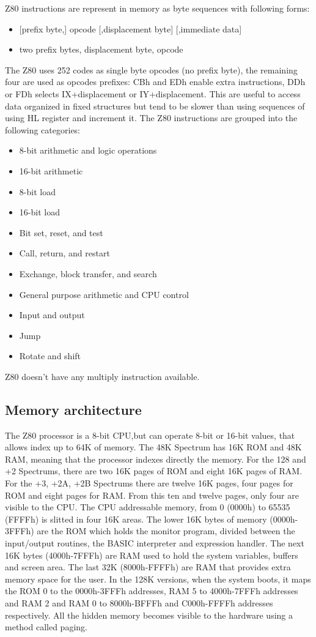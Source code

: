 Z80 instructions are represent in memory as byte sequences with following forms:
\begin{itemize}
\item {[prefix byte,]  opcode  [,displacement byte]  [,immediate data]}
\item {two prefix bytes,  displacement byte,  opcode}
\end{itemize}
The Z80 uses 252 codes as single byte opcodes (no prefix byte), the remaining four are used as opcodes prefixes: CBh and EDh enable extra instructions, DDh or FDh selects IX+displacement or IY+displacement. This are useful to access data organized in fixed structures but tend to be slower than using sequences of using HL register and increment it.
The Z80 instructions are grouped into the following categories:
\begin{itemize}
\item {8-bit arithmetic and logic operations}
\item {16-bit arithmetic}
\item {8-bit load}
\item {16-bit load}
\item {Bit set, reset, and test}
\item {Call, return, and restart}
\item {Exchange, block transfer, and search}
\item {General purpose arithmetic and CPU control}
\item {Input and output}
\item {Jump}
\item {Rotate and shift}
\end{itemize}
Z80 doesn’t have any multiply instruction available.

\subsection{Memory architecture}
The Z80 processor is a 8-bit CPU,but can operate 8-bit or 16-bit values, that allows index up to 64K of memory. The 48K Spectrum has 16K ROM and 48K RAM, meaning that the processor indexes directly  the memory. For the 128 and +2 Spectrums, there are two 16K pages of ROM and eight 16K pages of RAM. For the +3, +2A, +2B Spectrums there are twelve 16K pages, four pages for ROM and eight pages for RAM. From this ten and twelve pages, only four are visible to the CPU.
The CPU addressable memory, from 0 (0000h) to 65535 (FFFFh) is slitted in four 16K areas. The lower 16K bytes of memory (0000h-3FFFh) are the ROM which holds the monitor program, divided between the input/output routines, the BASIC interpreter and expression handler. The next 16K bytes (4000h-7FFFh) are RAM used to hold the system variables, buffers and screen area. The last 32K (8000h-FFFFh) are RAM that provides extra memory space for the user.
In the 128K versions, when the system boots, it maps the ROM 0 to the 0000h-3FFFh addresses, RAM 5 to 4000h-7FFFh addresses and RAM 2 and RAM 0 to 8000h-BFFFh and C000h-FFFFh addresses respectively. All the hidden memory becomes visible to the hardware using a method called paging.


